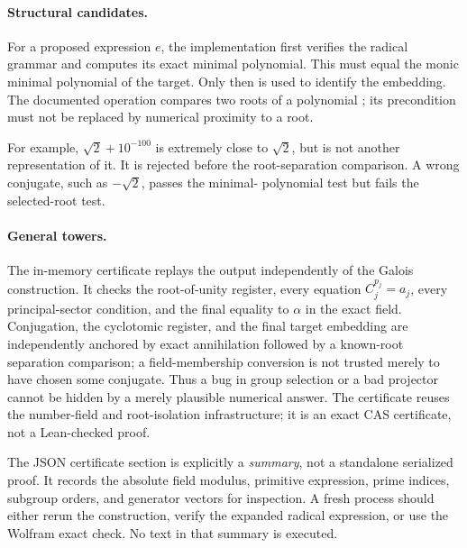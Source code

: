 \documentclass[11pt,letterpaper]{article}
\theoremstyle{definition}\newtheorem{definition}[theorem]{Definition}
\theoremstyle{remark}\newtheorem{remark}[theorem]{Remark}
\begin{document}
\paragraph{Structural candidates.}
For a proposed expression \(e\), the implementation first verifies the radical
grammar and computes its exact minimal polynomial. This must equal the monic
minimal polynomial of the target. Only then is
 used to identify the embedding. The documented
operation compares two roots of a polynomial \cite{sympypolys}; its precondition
must not be replaced by numerical proximity to a root.

For example, \(\sqrt2+10^{-100}\) is extremely close to \(\sqrt2\), but is
not another representation of it. It is rejected before the root-separation
comparison. A wrong conjugate, such as \(-\sqrt2\), passes the minimal-
polynomial test but fails the selected-root test.

\paragraph{General towers.}
The in-memory certificate replays the output independently of the Galois
construction. It checks the root-of-unity register, every equation
\(C_j^{p_j}=a_j\), every principal-sector condition, and the final equality to
\(\alpha\) in the exact field. Conjugation, the cyclotomic register, and
the final target embedding are independently anchored by exact annihilation
followed by a known-root separation comparison; a field-membership conversion
is not trusted merely to have chosen some conjugate. Thus a bug in group selection or a bad
projector cannot be hidden by a merely plausible numerical answer.
The certificate reuses the number-field and root-isolation infrastructure; it
is an exact CAS certificate, not a Lean-checked proof.

The JSON certificate section is explicitly a \emph{summary}, not a standalone
serialized proof. It records the absolute field modulus, primitive expression,
prime indices, subgroup orders, and generator vectors for inspection. A fresh
process should either rerun the construction, verify the expanded radical
expression, or use the Wolfram exact check. No text in that summary is executed.
\end{document}
